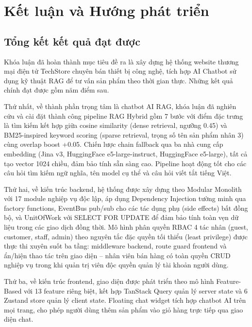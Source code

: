 \chapter*{Kết luận và Hướng phát triển}
\label{chap:conclusion}

\section*{Tổng kết kết quả đạt được}

Khóa luận đã hoàn thành mục tiêu đề ra là xây dựng hệ thống website thương mại điện tử TechStore chuyên bán thiết bị công nghệ, tích hợp AI Chatbot sử dụng kỹ thuật RAG để tư vấn sản phẩm theo thời gian thực. Những kết quả chính đạt được gồm năm điểm sau.

Thứ nhất, về thành phần trọng tâm là chatbot AI RAG, khóa luận đã nghiên cứu và cài đặt thành công pipeline RAG Hybrid gồm 7 bước với điểm đặc trưng là tìm kiếm kết hợp giữa cosine similarity (dense retrieval, ngưỡng 0.45) và BM25-inspired keyword scoring (sparse retrieval, trọng số tên sản phẩm nhân 3) cùng overlap boost +0.05. Chiến lược chain fallback qua ba nhà cung cấp embedding (Jina v3, HuggingFace e5-large-instruct, HuggingFace e5-large), tất cả tạo vector 1024 chiều, đảm bảo tính sẵn sàng cao. Pipeline hoạt động tốt cho các câu hỏi tìm kiếm ngữ nghĩa, tên model cụ thể và câu hỏi viết tắt tiếng Việt.

Thứ hai, về kiến trúc backend, hệ thống được xây dựng theo Modular Monolith với 17 module nghiệp vụ độc lập, áp dụng Dependency Injection tường minh qua factory functions, EventBus pub/sub cho các tác dụng phụ (side effects) bất đồng bộ, và UnitOfWork với SELECT FOR UPDATE để đảm bảo tính toàn vẹn dữ liệu trong các giao dịch đồng thời. Mô hình phân quyền RBAC 4 tác nhân (guest, customer, staff, admin) theo nguyên tắc đặc quyền tối thiểu (least privilege) được thực thi xuyên suốt ba tầng: middleware backend, route guard frontend và ẩn/hiện thao tác trên giao diện -- nhân viên bán hàng có toàn quyền CRUD nghiệp vụ trong khi quản trị viên độc quyền quản lý tài khoản người dùng.

Thứ ba, về kiến trúc frontend, giao diện được phát triển theo mô hình Feature-Based với 13 feature riêng biệt, kết hợp TanStack Query quản lý server state và 6 Zustand store quản lý client state. Floating chat widget tích hợp chatbot AI trên mọi trang, cho phép người dùng thêm sản phẩm vào giỏ hàng trực tiếp qua giao diện chat.

